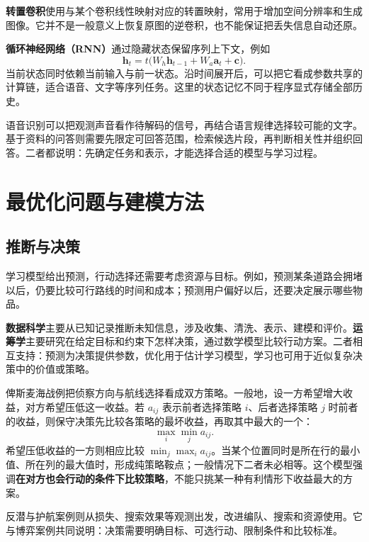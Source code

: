 \documentclass[UTF8,fontset=fandol,a4paper,12pt]{ctexart}
\newcommand{\va}{\boldsymbol a}
\theoremstyle{definition}
\begin{document}
\textbf{转置卷积}使用与某个卷积线性映射对应的转置映射，常用于增加空间分辨率和生成图像。它并不是一般意义上恢复原图的逆卷积，也不能保证把丢失信息自动还原。

\textbf{循环神经网络（RNN）}通过隐藏状态保留序列上下文，例如
\[
 \boldsymbol h_t=t\bigl(W_h\boldsymbol h_{t-1}+W_a\va_t+\boldsymbol c\bigr).
\]
当前状态同时依赖当前输入与前一状态。沿时间展开后，可以把它看成参数共享的计算链，适合语音、文字等序列任务。这里的状态记忆不同于程序显式存储全部历史。

语音识别可以把观测声音看作待解码的信号，再结合语言规律选择较可能的文字。基于资料的问答则需要先限定可回答范围，检索候选片段，再判断相关性并组织回答。二者都说明：先确定任务和表示，才能选择合适的模型与学习过程。

\section{最优化问题与建模方法}
\subsection{推断与决策}
学习模型给出预测，行动选择还需要考虑资源与目标。例如，预测某条道路会拥堵以后，仍要比较可行路线的时间和成本；预测用户偏好以后，还要决定展示哪些物品。

\textbf{数据科学}主要从已知记录推断未知信息，涉及收集、清洗、表示、建模和评价。\textbf{运筹学}主要研究在给定目标和约束下怎样决策，通过数学模型比较行动方案。二者相互支持：预测为决策提供参数，优化用于估计学习模型，学习也可用于近似复杂决策中的价值或策略。

俾斯麦海战例把侦察方向与航线选择看成双方策略。一般地，设一方希望增大收益，对方希望压低这一收益。若 $a_{ij}$ 表示前者选择策略 $i$、后者选择策略 $j$ 时前者的收益，则保守决策先比较各策略的最坏收益，再取其中最大的一个：
\[
 \max_i\min_j a_{ij}.
\]
希望压低收益的一方则相应比较 $\min_j\max_i a_{ij}$。当某个位置同时是所在行的最小值、所在列的最大值时，形成纯策略鞍点；一般情况下二者未必相等。这个模型强调\textbf{在对方也会行动的条件下比较策略}，不能只挑某一种有利情形下收益最大的方案。

反潜与护航案例则从损失、搜索效果等观测出发，改进编队、搜索和资源使用。它与博弈案例共同说明：决策需要明确目标、可选行动、限制条件和比较标准。
\end{document}
